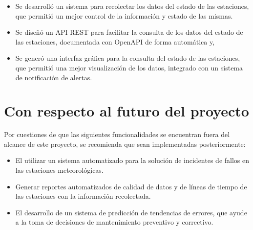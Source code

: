 


\begin{itemize}
   \item Se desarrolló un sistema para recolectar los datos del estado de las estaciones, que permitió un mejor control de la información y estado de las mismas.

   \item Se diseñó un API REST para facilitar la consulta de los datos del estado de las estaciones, documentada con OpenAPI de forma automática y,


   \item Se generó una interfaz gráfica para la consulta del estado de las estaciones, que permitió una mejor visualización de los datos, integrado con un sistema de notificación de alertas.


\end{itemize}



\section{Con respecto al futuro del proyecto}

Por cuestiones de que las siguientes funcionalidades se encuentran fuera del alcance de este proyecto, se recomienda que sean implementadas posteriormente:

\begin{itemize}
   \item El utilizar un sistema automatizado para la solución de incidentes de fallos en las estaciones meteorológicas.
   \item Generar reportes automatizados de calidad de datos y de líneas de tiempo de las estaciones con la información recolectada.
   \item El desarrollo de un sistema de predicción de tendencias de errores, que ayude a la toma de decisiones de mantenimiento preventivo y correctivo.
\end{itemize}

